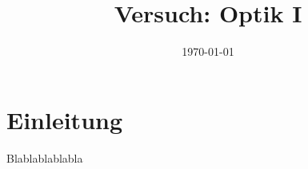 \documentclass[a4paper,25pt,twoside]{article}
\title{Versuch: Optik I}
\author{\names}
\date{\today}
\begin{document}
\maketitle
\tableofcontents

\newpage
\section{Einleitung}
Blablablablabla


%
%
%
\end{document}
